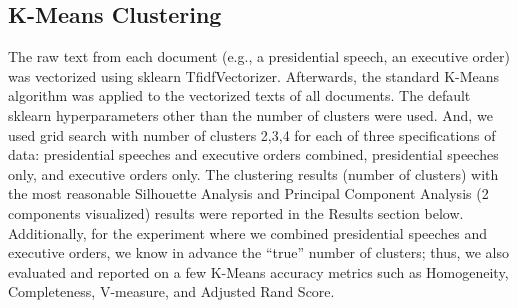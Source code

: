 \documentclass{article}
\begin{document}
{\subsection{K-Means Clustering}{The raw text from each document (e.g., a presidential speech, an executive order) was vectorized using sklearn TfidfVectorizer. Afterwards, the standard K-Means algorithm was applied to the vectorized texts of all documents. The default sklearn hyperparameters other than the number of clusters were used. And, we used grid search with number of clusters {2,3,4} for each of three specifications of data: presidential speeches and executive orders combined, presidential speeches only, and executive orders only. The clustering results (number of clusters) with the most reasonable Silhouette Analysis and Principal Component Analysis (2 components visualized) results were reported in the Results section below. Additionally, for the experiment where we combined presidential speeches and executive orders, we know in advance the “true” number of clusters; thus, we also evaluated and reported on a few K-Means accuracy metrics such as Homogeneity, Completeness, V-measure, and Adjusted Rand Score.}

}
\end{document}
